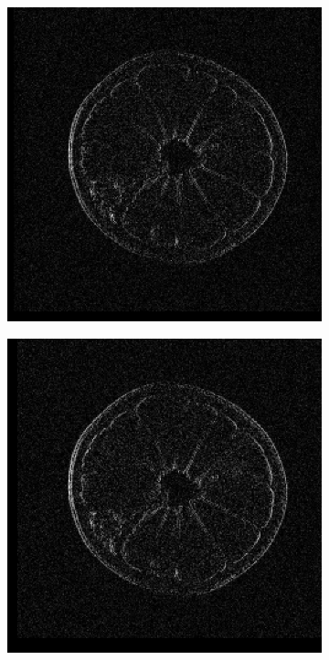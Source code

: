 \begin{figure}[htpb]
\begin{subfigure}{0.33\textwidth}
	\includegraphics[width=1\textwidth]{img/grapeMRIDif1with3.png}
\end{subfigure}%
\begin{subfigure}{0.33\textwidth}
	\includegraphics[width=1\textwidth]{img/grapeMRIDif1with5.png}

\end{subfigure}
\end{figure}
